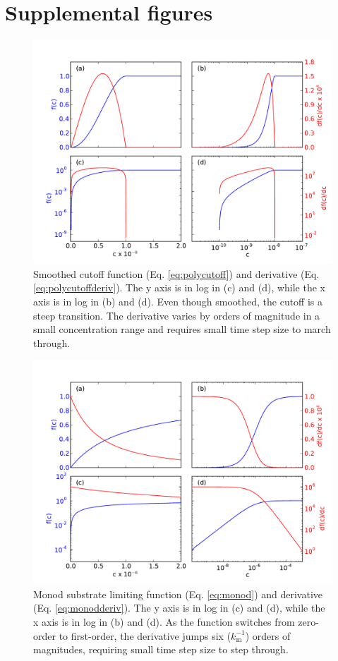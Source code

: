 \documentclass[gmd, manuscript]{copernicus}
\begin{document}
\section{Supplemental figures}    %
\begin{figure}[h]
\includegraphics[width=15cm]{../figs/fig02/fig02cutoff.pdf}
\caption{Smoothed cutoff function (Eq. \ref{eq:polycutoff}) and derivative (Eq.
\ref{eq:polycutoffderiv}). The y axis is in log in (c) and (d), while the x
axis is in log in (b) and (d). Even though smoothed, the cutoff is a steep
transition. The derivative varies by orders of magnitude in a small
concentration range and requires small time step size to march through.}
\label{fig:cutoff}
\end{figure}


\begin{figure}[t]
\includegraphics[width=15cm]{../figs/fig03/fig03monod.pdf}
\caption{Monod substrate limiting function (Eq. \ref{eq:monod}) and derivative
(Eq. \ref{eq:monodderiv}). The y axis is in log in (c) and (d), while the x
axis is in log in (b) and (d). As the function switches from zero-order to
first-order, the derivative jumps six ($k_\text{m}^{-1}$) orders of magnitudes,
requiring small time step size to step through.}
\label{fig:monod}
\end{figure}
\end{document}
